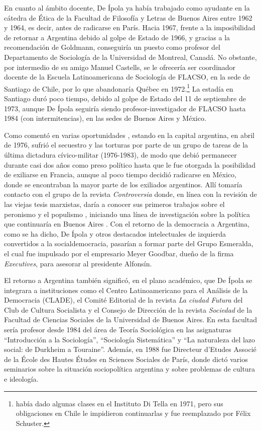 En cuanto al ámbito docente, De Ípola ya había trabajado como ayudante en la cátedra de Ética de la Facultad de Filosofía y Letras de Buenos Aires entre 1962 y 1964, es decir, antes de radicarse en París. Hacia 1967, frente a la imposibilidad de retornar a Argentina debido al golpe de Estado de 1966, y gracias a la recomendación de Goldmann, conseguiría un puesto como profesor del Departamento de Sociología de la Universidad de Montreal, Canadá. No obstante, por intermedio de su amigo Manuel Castells, se le ofrecería ser coordinador docente de la Escuela Latinoamericana de Sociología de FLACSO, en la sede de Santiago de Chile, por lo que abandonaría Québec en 1972.\footnote{\textcite{1606-DEIPOLA2010} había dado algunas clases en el Instituto Di Tella en 1971, pero sus obligaciones en Chile le impidieron continuarlas y fue reemplazado por Félix Schuster.} La estadía en Santiago duró poco tiempo, debido al golpe de Estado del 11 de septiembre de 1973, aunque De Ípola seguiría siendo profesor-investigador de FLACSO hasta 1984 (con intermitencias), en las sedes de Buenos Aires y México.

Como comentó en varias oportunidades \parencite{1586-DEIPOLA1982,1601-DEIPOLA1994,1593-DEIPOLA2005,1589-DEIPOLA2021}, estando en la capital argentina, en abril de 1976, sufrió el secuestro y las torturas por parte de un grupo de tareas de la última dictadura cívico-militar (1976-1983), de modo que debió permanecer durante casi dos años como preso político hasta que le fue otorgada la posibilidad de exiliarse en Francia, aunque al poco tiempo decidió radicarse en México, donde se encontraban la mayor parte de los exiliados argentinos. Allí tomaría contacto con el grupo de la revista \emph{Controversia} donde, en línea con la revisión de las viejas tesis marxistas, daría a conocer sus primeros trabajos sobre el peronismo y el populismo , iniciando una línea de investigación sobre la política que continuaría en Buenos Aires \parencite{1588-DEIPOLA1989}. Con el retorno de la democracia a Argentina, como se ha dicho, De Ípola y otros destacados intelectuales de izquierda convertidos a la socialdemocracia, pasarían a formar parte del Grupo Esmeralda, el cual fue impulsado por el empresario Meyer Goodbar, dueño de la firma \emph{Executives}, para asesorar al presidente Alfonsín.

El retorno a Argentina también significó, en el plano académico, que De Ípola se integrara a instituciones como el Centro Latinoamericano para el Análisis de la Democracia (CLADE), el Comité Editorial de la revista \emph{La ciudad Futura} del Club de Cultura Socialista y el Consejo de Dirección de la revista \emph{Sociedad} de la Facultad de Ciencias Sociales de la Universidad de Buenos Aires. En esta facultad sería profesor desde 1984 del área de Teoría Sociológica en las asignaturas \enquote{Introducción a la Sociología}, \enquote{Sociología Sistemática} y \enquote{La naturaleza del lazo social: de Durkheim a Touraine}. Además, en 1988 fue Directeur d'Etudes Associé de la École des Hautes Études en Sciences Sociales de París, donde dictó varios seminarios sobre la situación sociopolítica argentina y sobre problemas de cultura e ideología.

